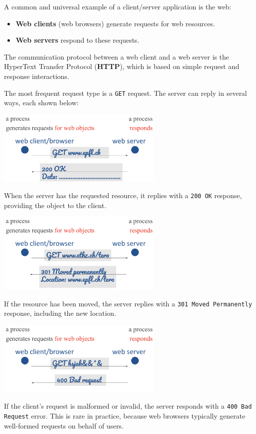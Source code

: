 \documentclass[../../compsys.tex]{subfiles}
\begin{document}
\vspace{1em}

A common and universal example of a client/server application is the web:
\begin{itemize}
    \item \textbf{Web clients} (web browsers) generate requests for web resources.
    \item \textbf{Web servers} respond to these requests.
\end{itemize}


The communication protocol between a web client and a web server is the HyperText Transfer Protocol (\textbf{HTTP}), which is based on simple request and response interactions.

\vspace{1em}

The most frequent request type is a \texttt{GET} request. The server can reply in several ways, each shown below:

\begin{center}
    \includegraphics[width=0.6\textwidth]{images/200.png}
\end{center}
When the server has the requested resource, it replies with a \texttt{200 OK} response, providing the object to the client.

\begin{center}
    \includegraphics[width=0.6\textwidth]{images/301.png}
\end{center}
If the resource has been moved, the server replies with a \texttt{301 Moved Permanently} response, including the new location.

\begin{center}
    \includegraphics[width=0.6\textwidth]{images/400.png}
\end{center}
If the client's request is malformed or invalid, the server responds with a \texttt{400 Bad Request} error. This is rare in practice, because web browsers typically generate well-formed requests on behalf of users.
\end{document}
